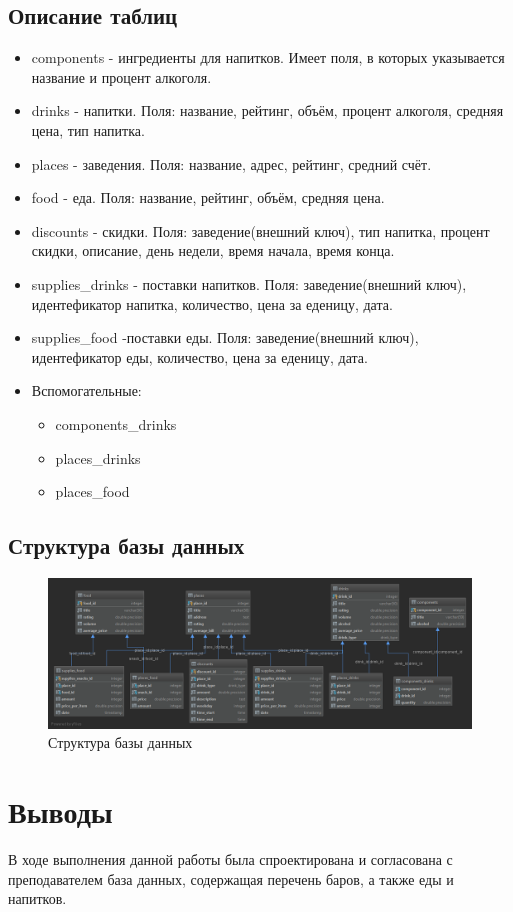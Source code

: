 \subsection{Описание таблиц}
\begin{itemize}
	\item components - ингредиенты для напитков. Имеет поля, в которых указывается название и процент алкоголя.
	\item drinks - напитки. Поля: название, рейтинг, объём, процент алкоголя, средняя цена, тип напитка.
	\item places - заведения. Поля: название, адрес, рейтинг, средний счёт.
	\item food - еда. Поля: название, рейтинг, объём, средняя цена.
	\item discounts - скидки. Поля: заведение(внешний ключ), тип напитка, процент скидки, описание, день недели, время начала, время конца.
	\item supplies\_drinks - поставки напитков. Поля: заведение(внешний ключ), идентефикатор напитка, количество, цена за еденицу, дата.
	\item supplies\_food -поставки еды. Поля: заведение(внешний ключ), идентефикатор еды, количество, цена за еденицу, дата.
	\item Вспомогательные: 
		\begin {itemize}
		\item components\_drinks
		\item places\_drinks
		\item places\_food
	\end {itemize}
\end{itemize}


\subsection{Структура базы данных}

\begin{figure}[H]
	\begin{center}
		\includegraphics[scale=0.3]{../structure.png}
		\caption{Структура базы данных} 
		\label{pic:struct} %
	\end{center}
\end{figure}

\section{Выводы}

В ходе выполнения данной работы была спроектирована и согласована с преподавателем база данных, содержащая перечень баров, а также еды и напитков.



